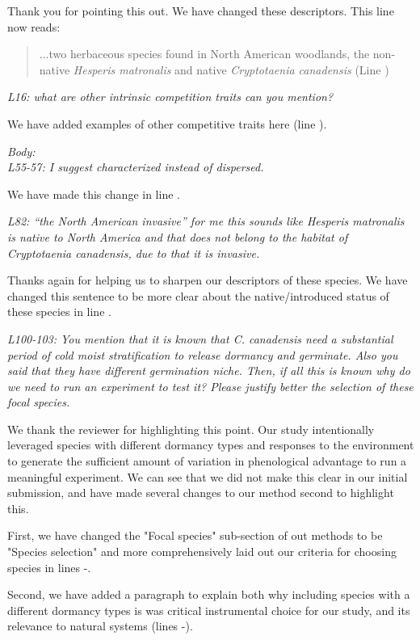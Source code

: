 \documentclass[11pt]{article}
\begin{document}
Thank you for pointing this out. We have changed these descriptors. This line now reads:
\begin{quote}...two herbaceous species found in North American woodlands, the non-native \textit{Hesperis matronalis} and native \textit{Cryptotaenia canadensis} (Line ) \end{quote}

\emph{L16: what are other intrinsic competition traits can you mention?}

We have added examples of other competitive traits here (line ). 

\emph{Body:}\\
\emph{L55-57: I suggest characterized instead of dispersed.}

We have made this change in line .

\emph{L82: “the North American invasive” for me this sounds like Hesperis matronalis is native to North America and that does not belong to the habitat of Cryptotaenia canadensis, due to that it is invasive.}

Thanks again for helping us to sharpen our descriptors of these species. We have changed this sentence to be more clear about the native/introduced status of these species in line .

\emph{L100-103: You mention that it is known that C. canadensis need a substantial period of cold moist stratification to release dormancy and germinate. Also you said that they have different germination niche. Then, if all this is known why do we need to run an experiment to test it? Please justify better the selection of these focal species.}

We thank the reviewer for highlighting this point. Our study intentionally leveraged species with different dormancy types and responses to the environment to generate the sufficient amount of variation in phenological advantage to run a meaningful experiment. We can see that we did not make this clear in our initial submission, and have made several changes to our method second to highlight this.

First, we have changed the "Focal species" sub-section of out methods to be "Species selection" and more comprehensively laid out our criteria for choosing species in lines -.

Second, we have added a paragraph to explain both why including species with a different dormancy types is was critical instrumental choice for our study, and its relevance to natural systems (lines -).
\end{document}
